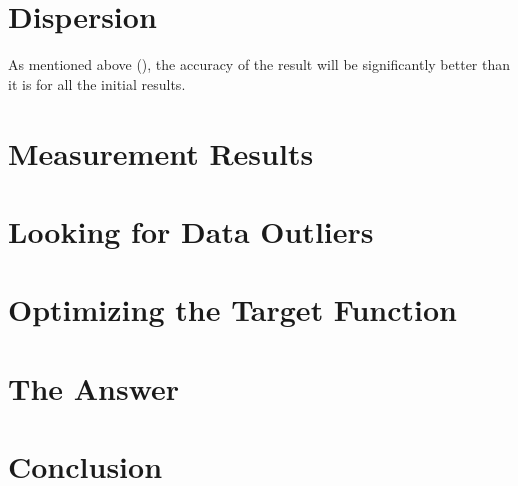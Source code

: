 \documentclass[11pt]{memoir}
\begin{document}
%
%

    \section {Dispersion}\label{sec:dispersion}
        \newline
        As mentioned above (), the accuracy of the result will be significantly better than it is for all the initial results.

    \section{Measurement Results}\label{sec:measurement-results}

    \section {Looking for Data Outliers}\label{sec:looking-for-data-outliers}

    \section{Optimizing the Target Function}\label{sec:optimizing-the-target-function}


    \section{The Answer}\label{sec:answer}


    \section{Conclusion}\label{sec:conclusion}



\end{document}
